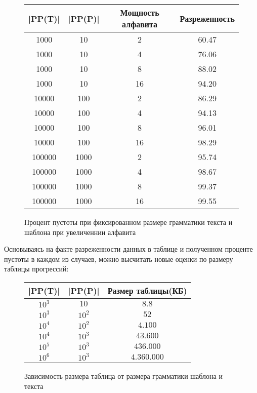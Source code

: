 \documentclass[14pt]{article}
\begin{document}
\begin{figure}
\begin{center}
    \begin{tabular}{ | c | c | c | c |}
        \hline |PP(T)| & |PP(P)| & Мощность алфавита & Разреженность \\
       	\hline 1000 & 10 & 2 & 60.47 \\
		\hline 1000 & 10 & 4 & 76.06 \\
		\hline 1000 & 10 & 8 & 88.02 \\
		\hline 1000 & 10 & 16 & 94.20 \\
		\hline 10000 & 100 & 2 & 86.29 \\
		\hline 10000 & 100 & 4 & 94.13 \\
		\hline 10000 & 100 & 8 & 96.01 \\
		\hline 10000 & 100 & 16 & 98.29 \\
       	\hline 100000 & 1000 & 2 & 95.74 \\
		\hline 100000 & 1000 & 4 & 98.67 \\
		\hline 100000 & 1000 & 8 & 99.37 \\
		\hline 100000 & 1000 & 16 & 99.55 \\
	\hline
    \end{tabular}
    \end{center}
    \caption{Процент пустоты при фиксированном размере грамматики текста и шаблона при увеличеннии алфавита}
    \label{typical_research}
\end{figure}

Основываясь на факте разреженности данных в таблице и полученном проценте пустоты в каждом из случаев, можно высчитать новые оценки по размеру таблицы прогрессий:

\begin{figure}
	\begin{center}
    \begin{tabular}{ | c | c | c |}
        \hline |PP(T)| & |PP(P)| & Размер таблицы(КБ) \\
        \hline $10^3$ & $10$ & $8.8$ \\
        \hline $10^3$ & $10^2$ & $52$ \\
        \hline $10^4$ & $10^2$ & $4.100$ \\
        \hline $10^4$ & $10^3$ & $43.600$ \\
        \hline $10^5$ & $10^3$ & $436.000$ \\
        \hline $10^6$ & $10^3$ & $4.360.000$ \\
\hline
    \end{tabular}
    \end{center}
    \caption{Зависимость размера таблица от размера грамматики шаблона и текста}
    \label{typical_research}
\end{figure}
\end{document}
